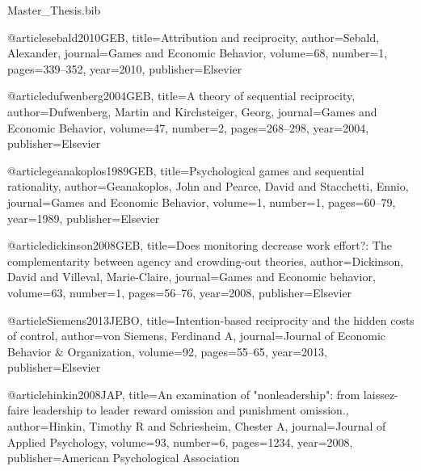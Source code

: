 \RequirePackage{filecontents}
\begin{filecontents}{Master_Thesis.bib}

@article{sebald2010GEB,
  title={Attribution and reciprocity},
  author={Sebald, Alexander},
  journal={Games and Economic Behavior},
  volume={68},
  number={1},
  pages={339--352},
  year={2010},
  publisher={Elsevier}
}

@article{dufwenberg2004GEB,
  title={A theory of sequential reciprocity},
  author={Dufwenberg, Martin and Kirchsteiger, Georg},
  journal={Games and Economic Behavior},
  volume={47},
  number={2},
  pages={268--298},
  year={2004},
  publisher={Elsevier}
}

@article{geanakoplos1989GEB,
  title={Psychological games and sequential rationality},
  author={Geanakoplos, John and Pearce, David and Stacchetti, Ennio},
  journal={Games and Economic Behavior},
  volume={1},
  number={1},
  pages={60--79},
  year={1989},
  publisher={Elsevier}
}

@article{dickinson2008GEB,
  title={Does monitoring decrease work effort?: The complementarity between agency and crowding-out theories},
  author={Dickinson, David and Villeval, Marie-Claire},
  journal={Games and Economic behavior},
  volume={63},
  number={1},
  pages={56--76},
  year={2008},
  publisher={Elsevier}
}

@article{Siemens2013JEBO,
  title={Intention-based reciprocity and the hidden costs of control},
  author={von Siemens, Ferdinand A},
  journal={Journal of Economic Behavior \& Organization},
  volume={92},
  pages={55--65},
  year={2013},
  publisher={Elsevier}
}

@article{hinkin2008JAP,
  title={An examination of "nonleadership": from laissez-faire leadership to leader reward omission and punishment omission.},
  author={Hinkin, Timothy R and Schriesheim, Chester A},
  journal={Journal of Applied Psychology},
  volume={93},
  number={6},
  pages={1234},
  year={2008},
  publisher={American Psychological Association}
}

\end{filecontents}


